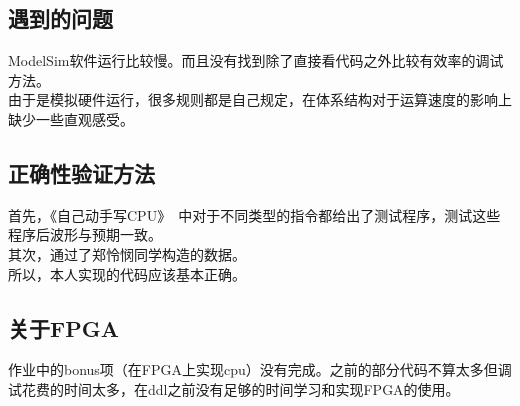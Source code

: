 \subsection{遇到的问题}
ModelSim软件运行比较慢。而且没有找到除了直接看代码之外比较有效率的调试方法。\\
由于是模拟硬件运行，很多规则都是自己规定，在体系结构对于运算速度的影响上缺少一些直观感受。

\subsection{正确性验证方法}
首先，《自己动手写CPU》\cite{book}　中对于不同类型的指令都给出了测试程序，测试这些程序后波形与预期一致。　\\
其次，通过了郑怜悯同学构造的数据。 \\
所以，本人实现的代码应该基本正确。

\subsection{关于FPGA}
作业中的bonus项（在FPGA上实现cpu）没有完成。之前的部分代码不算太多但调试花费的时间太多，在ddl之前没有足够的时间学习和实现FPGA的使用。
